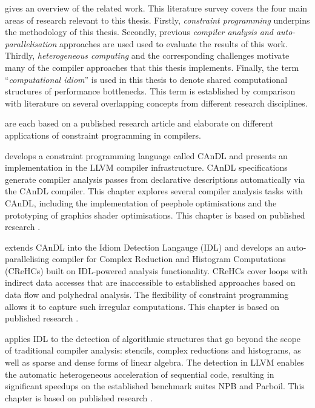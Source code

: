     {\bf{}} gives an overview of the related work.
    This literature survey covers the four main areas of research relevant to
    this thesis.
    Firstly, {\em constraint programming} underpins the methodology of this
    thesis.
    Secondly, previous {\em compiler analysis and auto-parallelisation}
    approaches are used used to evaluate the results of this work.
    Thirdly, {\em heterogeneous computing} and the corresponding challenges
    motivate many of the compiler approaches that this thesis implements.
    Finally, the term ``{\em computational idiom}'' is used in this thesis to
    denote shared computational structures of performance bottlenecks.
    This term is established by comparison with literature on several
    overlapping concepts from different research disciplines.

    {\bf{}}
    are each based on a published research article and elaborate on different
    applications of constraint programming in compilers.

    {\bf{}} develops a constraint programming language called
    CAnDL and presents an implementation in the LLVM compiler infrastructure.
    CAnDL specifications generate compiler analysis
    passes from declarative descriptions automatically via the CAnDL compiler.
    This chapter explores several compiler analysis tasks with CAnDL,
    including the implementation of peephole optimisations and the
    prototyping of graphics shader optimisations.
    This chapter is based on published research
    \citep{Ginsbach:2018:CDS:3178372.3179515}.

    {\bf{}} extends CAnDL into the Idiom Detection
    Langauge (IDL) and develops an auto-parallelising compiler for
    Complex Reduction and Histogram Computations (CReHCs) built on
    IDL-powered analysis functionality.
    CReHCs cover loops with indirect data accesses that are
    inaccessible to established approaches based on data flow and polyhedral
    analysis.
    The flexibility of constraint programming allows it to capture such
    irregular computations.
    This chapter is based on published research
    \citep{ginsbach2017discovery}.

    {\bf{}} applies IDL to the detection of algorithmic
    structures that go beyond the scope of traditional compiler analysis:
    stencils, complex reductions and histograms, as well as sparse and dense
    forms of linear algebra.
    The detection in LLVM enables the automatic heterogeneous
    acceleration of sequential code, resulting in significant speedups on the
    established benchmark suites NPB and Parboil.
    This chapter is based on published research
    \citep{Ginsbach:2018:AML:3173162.3173182}.

